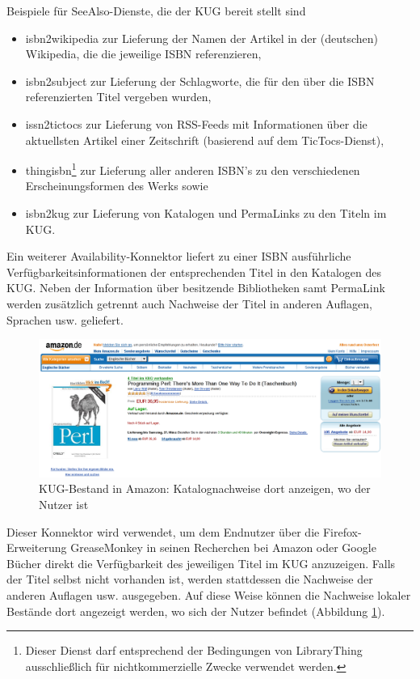 \documentclass[11pt]{scrartcl}
\begin{document}
Beispiele für SeeAlso-Dienste, die der KUG bereit stellt sind

\begin{itemize}
\item isbn2wikipedia zur Lieferung der Namen der Artikel in der
  (deutschen) Wikipedia, die die jeweilige ISBN referenzieren,
\item isbn2subject zur Lieferung der Schlagworte, die für den über die
  ISBN referenzierten Titel vergeben wurden,
\item issn2tictocs zur Lieferung von RSS-Feeds mit Informationen über
  die aktuellsten Artikel einer Zeitschrift (basierend auf dem
  TicTocs-Dienst), 
\item thingisbn\footnote{Dieser Dienst darf entsprechend der
    Bedingungen von LibraryThing ausschließlich für nichtkommerzielle
    Zwecke verwendet werden.} zur Lieferung aller anderen ISBN's zu
  den verschiedenen Erscheinungsformen des Werks sowie
\item isbn2kug zur
  Lieferung von Katalogen und PermaLinks zu den Titeln im KUG.
\end{itemize}

Ein weiterer Availability-Konnektor liefert zu einer ISBN ausführliche
Verfügbarkeitsinformationen der entsprechenden Titel in den Katalogen
des KUG. Neben der Information über besitzende Bibliotheken samt
PermaLink werden zusätzlich getrennt auch Nachweise der Titel in
anderen Auflagen, Sprachen usw. geliefert.

\begin{figure}
    \centering \begin{minipage}[b]{1.0\textwidth}
      \centering \includegraphics[width=15cm]{bib20-kug-mashups_bilder/greasemonkey_amazon.png}
    \end{minipage}
    \caption{KUG-Bestand in Amazon: Katalognachweise dort anzeigen, wo der Nutzer ist}
  \label{bild:amazon}
\end{figure}

Dieser Konnektor wird verwendet, um dem Endnutzer über die
Firefox-Erweiterung GreaseMonkey in seinen Recherchen bei Amazon oder
Google Bücher direkt die Verfügbarkeit des jeweiligen Titel im KUG
anzuzeigen. Falls der Titel selbst nicht vorhanden ist, werden
stattdessen die Nachweise der anderen Auflagen usw. ausgegeben. Auf
diese Weise können die Nachweise lokaler Bestände dort angezeigt
werden, wo sich der Nutzer befindet (Abbildung \ref{bild:amazon}).
  
\end{document}
